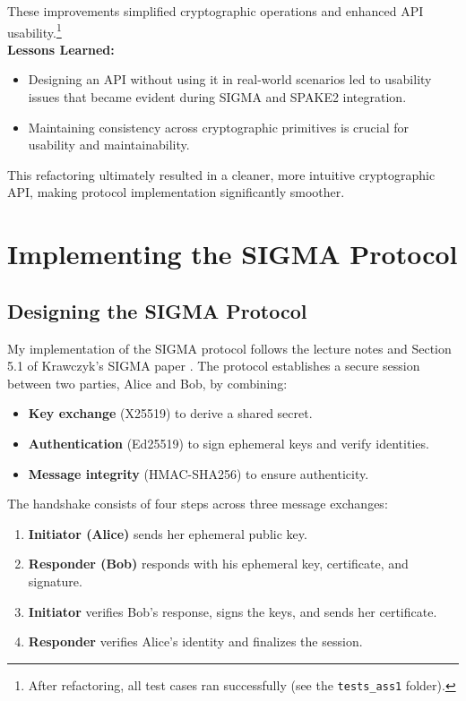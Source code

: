 \documentclass[twoside,a4paper,12pt]{article}
\begin{document}
These improvements simplified cryptographic operations and enhanced API usability.\footnote{After refactoring, all test cases ran successfully (see the \texttt{tests\_ass1} folder).} \\

\textbf{Lessons Learned:}
\begin{itemize}
    \item Designing an API without using it in real-world scenarios led to usability issues that became evident during SIGMA and SPAKE2 integration.
    \item Maintaining consistency across cryptographic primitives is crucial for usability and maintainability.
\end{itemize}

This refactoring ultimately resulted in a cleaner, more intuitive cryptographic API, making protocol implementation significantly smoother.


\section{Implementing the SIGMA Protocol}
\label{sec:sigma}

\subsection{Designing the SIGMA Protocol}
\label{subsec:sigma_design}

My implementation of the SIGMA protocol follows the lecture notes \cite{P79LectureNotes} and Section 5.1 of Krawczyk's SIGMA paper \cite{SIGMA}. The protocol establishes a secure session between two parties, Alice and Bob, by combining:

\begin{itemize}
\item \textbf{Key exchange} (X25519) to derive a shared secret.
\item \textbf{Authentication} (Ed25519) to sign ephemeral keys and verify identities.
\item \textbf{Message integrity} (HMAC-SHA256) to ensure authenticity.
\end{itemize}

The handshake consists of four steps across three message exchanges:

\begin{enumerate}
\item \textbf{Initiator (Alice)} sends her ephemeral public key.
\item \textbf{Responder (Bob)} responds with his ephemeral key, certificate, and signature.
\item \textbf{Initiator} verifies Bob's response, signs the keys, and sends her certificate.
\item \textbf{Responder} verifies Alice's identity and finalizes the session.
\end{enumerate}
\end{document}
